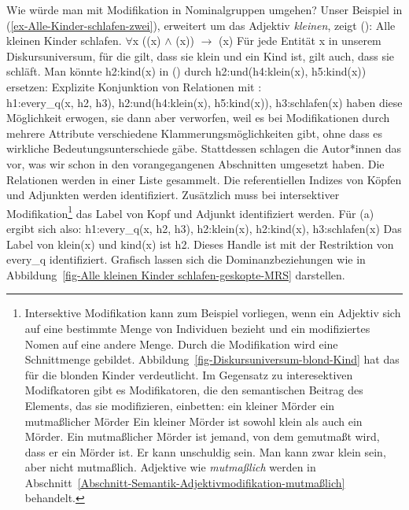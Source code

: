 Wie würde man mit Modifikation in Nominalgruppen umgehen? Unser Beispiel in (\ref{ex-Alle-Kinder-schlafen-zwei}), erweitert um das
Adjektiv \emph{kleinen}, zeigt ():
\eal
\ex Alle kleinen Kinder schlafen.
\ex\label{ex-Aussagenlogik-Alle kleinen Kinder schlafen}
$\forall$x ((x) $\wedge$ (x)) $\to$ (x)
\ex Für jede Entität x in unserem Diskursuniversum, für die gilt, dass sie klein und ein Kind ist, gilt auch,
dass sie schläft.
\zl
Man könnte h2:kind(x) in () durch h2:und(h4:klein(x), h5:kind(x))
ersetzen:
\ea
Explizite Konjunktion von Relationen mit :\\
h1:every\_q(x, h2, h3), h2:und(h4:klein(x), h5:kind(x)), h3:schlafen(x)
\z
\citet[]{CFPS2005a} haben diese Möglichkeit erwogen, sie dann aber verworfen, weil es bei
Modifikationen durch mehrere Attribute verschiedene Klammerungsmöglichkeiten gibt, ohne dass es
wirkliche Bedeutungsunterschiede gäbe. Stattdessen schlagen die Autor*innen das vor, was wir schon
in den vorangegangenen Abschnitten umgesetzt haben. Die Relationen werden in einer Liste
gesammelt. Die referentiellen Indizes von Köpfen und Adjunkten werden identifiziert. Zusätzlich muss
bei intersektiver Modifikation\footnote{%
Intersektive Modifikation kann zum Beispiel vorliegen, wenn ein Adjektiv sich auf eine bestimmte Menge
von Individuen bezieht und ein modifiziertes Nomen auf eine andere Menge. Durch die Modifikation
wird eine Schnittmenge gebildet. Abbildung~\ref{fig-Diskursuniversum-blond-Kind} hat das für die
blonden Kinder verdeutlicht. Im Gegensatz zu interesektiven Modifkatoren gibt es Modifikatoren, die den semantischen Beitrag des
Elements, das sie modifizieren, einbetten:
\eal
\ex ein kleiner Mörder
\ex ein mutmaßlicher Mörder
\zl
Ein kleiner Mörder ist sowohl klein als auch ein Mörder. Ein mutmaßlicher Mörder ist jemand, von dem
gemutmaßt wird, dass er ein Mörder ist. Er kann unschuldig sein. Man kann zwar klein sein, aber
nicht mutmaßlich. Adjektive wie \emph{mutmaßlich} werden in
Abschnitt~\ref{Abschnitt-Semantik-Adjektivmodifikation-mutmaßlich} behandelt.%
} das Label von Kopf und Adjunkt identifiziert werden.
Für (a) ergibt sich also:
\ea
\label{ex-every-klein-kind-schlafen}
h1:every\_q(x, h2, h3), h2:klein(x), h2:kind(x), h3:schlafen(x)
\z
Das Label von klein(x) und kind(x) ist h2. Dieses Handle ist mit der Restriktion von every\_q
identifiziert. Grafisch lassen sich die Dominanzbeziehungen wie in Abbildung~\ref{fig-Alle
  kleinen Kinder schlafen-geskopte-MRS} darstellen.

